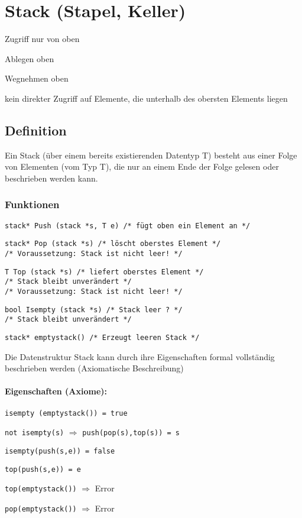 \section{Stack (Stapel, Keller)}
Zugriff nur {\flqq von oben\frqq}
\begin{compactitem}
	\item Ablegen oben
	\item Wegnehmen oben
	\item kein direkter Zugriff auf Elemente, die unterhalb des obersten Elements liegen
\end{compactitem}

\subsection{Definition}
Ein Stack (über einem bereits existierenden Datentyp T) besteht aus einer Folge von Elementen (vom Typ T), die nur an einem Ende der Folge gelesen oder beschrieben werden kann.

\subsubsection{Funktionen}
\begin{compactitem}
	\item \verb|stack* Push (stack *s, T e) /* fügt oben ein Element an */|
	\item \verb|stack* Pop (stack *s) /* löscht oberstes Element */|\\
	\verb|/* Voraussetzung: Stack ist nicht leer! */|
	\item \verb|T Top (stack *s) /* liefert oberstes Element */|\\
	\verb|/* Stack bleibt unverändert */|\\
	\verb|/* Voraussetzung: Stack ist nicht leer! */|
	\item \verb|bool Isempty (stack *s) /* Stack leer ? */|\\
	\verb|/* Stack bleibt unverändert */|
	\item \verb|stack* emptystack() /* Erzeugt leeren Stack */|
\end{compactitem}

Die Datenstruktur Stack kann durch ihre Eigenschaften formal vollständig beschrieben werden (Axiomatische Beschreibung)
\paragraph{Eigenschaften (Axiome):}
\begin{compactitem}
	\item \verb|isempty (emptystack()) = true|
	\item \verb|not isempty(s)| $\Rightarrow$ \verb|push(pop(s),top(s)) = s|
	\item \verb|isempty(push(s,e)) = false|
	\item \verb|top(push(s,e)) = e|
	\item \verb|top(emptystack())| $\Rightarrow$ Error
	\item \verb|pop(emptystack())| $\Rightarrow$ Error
\end{compactitem}

